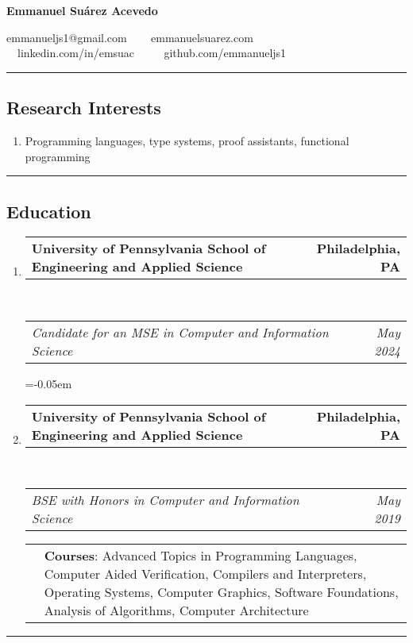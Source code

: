 \documentclass[letterpaper]{article}
\makeatletter
\newcommand*{\tabulardef}[3]{\begin{tabular}[t]{@{}lp{\dimexpr\linewidth-#1}@{}}
    #2&#3
\end{tabular}}
\newcommand{\headerrow}[2]
{\begin{tabular*}{\linewidth}{l@{\extracolsep{\fill}}r}
	#1 &
	#2 \\
\end{tabular*}}
\makeatother
\begin{document}
\begin{center}
{\LARGE \textbf{Emmanuel Suárez Acevedo}}

emmanueljs1@gmail.com \ \textbullet
\ \ emmanuelsuarez.com \\

\ \ linkedin.com/in/emsuac \ \ \textbullet
\ \ github.com/emmanueljs1\\
\end{center}

\hrule
\vspace{-0.6em}
\subsection*{Research Interests}
\begin{enumerate}[label=]
	\parskip=-0.25em

    \item Programming languages, type systems, proof assistants, functional programming
\end{enumerate}

\hrule
\vspace{-0.6em}
\subsection*{Education}
  
\begin{enumerate}[label=]
	\parskip=-0.05em
	\item 
	\headerrow
		{\textbf{University of Pennsylvania School of Engineering and Applied Science}}
		{\textbf{Philadelphia, PA}}
	\\
	\headerrow
		{\emph{Candidate for an MSE in Computer and Information Science}}
		{\emph{May 2024}}

	\parskip=-0.05em
	\item 
	\headerrow
		{\textbf{University of Pennsylvania School of Engineering and Applied Science}}
		{\textbf{Philadelphia, PA}}
	\\
	\headerrow
		{\emph{BSE with Honors in Computer and Information Science}}
		{\emph{May 2019}}
        \tabulardef{2.5cm}{}{\textbf{Courses}: Advanced Topics in Programming Languages, Computer Aided Verification, Compilers and Interpreters, Operating Systems, Computer Graphics, Software Foundations, Analysis of Algorithms, Computer Architecture }

\end{enumerate}

\hrule
\vspace{-0.6em}
\end{document}
